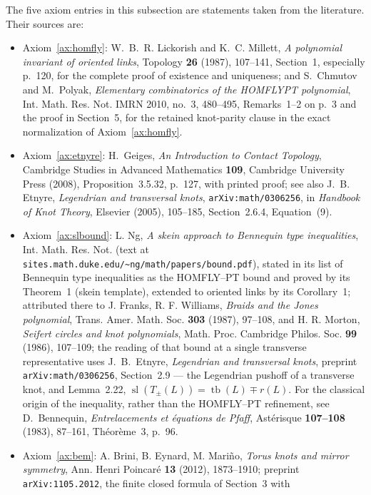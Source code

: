 The five axiom entries in this subsection are statements taken from the
literature. Their sources are:
\begin{itemize}
\item Axiom~\ref{ax:homfly}: W.~B.~R. Lickorish and K.~C. Millett,
\emph{A polynomial invariant of oriented links}, Topology \textbf{26}
(1987), 107--141, Section~1, especially p.~120, for the complete proof of
existence and uniqueness; and S.~Chmutov and M.~Polyak, \emph{Elementary
combinatorics of the HOMFLYPT polynomial}, Int. Math. Res. Not. IMRN 2010,
no.~3, 480--495, Remarks~1--2 on p.~3 and the proof in Section~5, for the
retained knot-parity clause in the exact normalization of
Axiom~\ref{ax:homfly}.
\item Axiom~\ref{ax:etnyre}: H.~Geiges, \emph{An Introduction to Contact
Topology}, Cambridge Studies in Advanced Mathematics \textbf{109}, Cambridge
University Press (2008), Proposition~3.5.32, p.~127, with printed proof; see
also J.~B. Etnyre, \emph{Legendrian and transversal knots},
\texttt{arXiv:math/0306256}, in \emph{Handbook of Knot Theory}, Elsevier
(2005), 105--185, Section~2.6.4, Equation~(9).
\item Axiom~\ref{ax:slbound}: L. Ng, \emph{A skein approach to Bennequin type
inequalities}, Int. Math. Res. Not. (text at
\texttt{sites.math.duke.edu/\~{}ng/math/papers/bound.pdf}), stated in its list
of Bennequin type inequalities as the HOMFLY--PT bound and proved by its
Theorem~1 (skein template), extended to oriented links by its Corollary~1;
attributed there to J. Franks, R. F. Williams, \emph{Braids and the Jones
polynomial}, Trans. Amer. Math. Soc. \textbf{303} (1987), 97--108, and
H. R. Morton, \emph{Seifert circles and knot polynomials}, Math. Proc.
Cambridge Philos. Soc. \textbf{99} (1986), 107--109; the reading of that bound
at a single transverse representative uses J.~B.~Etnyre, \emph{Legendrian and
transversal knots}, preprint \texttt{arXiv:math/0306256}, Section~2.9 --- the
Legendrian pushoff of a transverse knot, and Lemma~2.22,
$\operatorname{sl}(T_\pm(L))=\operatorname{tb}(L)\mp r(L)$. For the classical
origin of the inequality, rather than the HOMFLY--PT refinement, see
D.~Bennequin, \emph{Entrelacements et \'equations de Pfaff}, Ast\'erisque
\textbf{107--108} (1983), 87--161, Th\'eor\`eme~3, p.~96.
\item Axiom~\ref{ax:bem}: A. Brini, B. Eynard, M. Mari\~no, \emph{Torus knots
and mirror symmetry}, Ann. Henri Poincar\'e \textbf{13} (2012), 1873--1910;
preprint \texttt{arXiv:1105.2012}, the finite closed formula of Section~3 with

\end{itemize}
